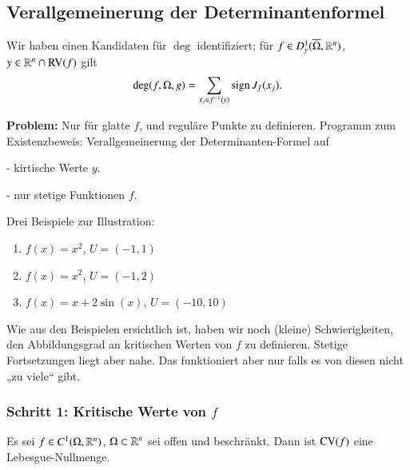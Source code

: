 \subsection{Verallgemeinerung der Determinantenformel}

Wir haben einen Kandidaten für $\deg$ identifiziert; für $f\in D^1_y(\overline\Omega,\mathbb{R}^n)$, $y\in \mathbb{R}^n\cap
\mathrm{RV}(f)$ gilt
\[
    \deg(f,\Omega, g)=\sum_{x_j\in f^{-1}(y)} \mathrm{sign}\, J_f(x_j).
\]

\noindent \textbf{Problem:} Nur für glatte $f$, und reguläre Punkte zu definieren. Programm zum 
Existenzbeweis: Verallgemeinerung der Determinanten-Formel auf
\begin{description}
    \item{-} kirtische Werte $y$.
    \item{-} nur stetige Funktionen $f$.
\end{description}

\noindent Drei Beispiele zur Illustration:
\begin{enumerate}
    \item $f(x)=x^2$, $U=(-1,1)$
    \item $f(x)=x^2$, $U=(-1,2)$
    \item $f(x)=x+2\sin(x)$, $U=(-10,10)$
\end{enumerate}
Wie aus den Beispielen ersichtlich ist, haben wir noch (kleine) Schwierigkeiten, den Abbildungsgrad
an kritischen Werten von $f$ zu definieren. Stetige Fortsetzungen liegt aber nahe. Das funktioniert
aber nur falls es von diesen nicht „zu viele“ gibt.

\subsubsection*{Schritt 1: Kritische Werte von $f$}

\begin{lem}[Sard]\label{2.5}

Es sei $f\in C^1(\Omega, \mathbb{R}^n)$, $\Omega\subset\mathbb{R}^n$ sei offen und beschränkt. Dann ist
$\mathrm{CV}(f)$ eine Lebesgue-Nullmenge.
\end{lem}
    
